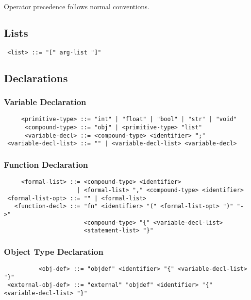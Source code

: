 Operator precedence follows normal conventions.

\subsection{Lists}
\begin{verbatim}
 <list> ::= "[" arg-list "]"
\end{verbatim}

\subsection{Declarations}

\subsubsection{Variable Declaration}

\begin{verbatim}
     <primitive-type> ::= "int" | "float" | "bool" | "str" | "void"
      <compound-type> ::= "obj" | <primitive-type> "list"
      <variable-decl> ::= <compound-type> <identifier> ";"
 <variable-decl-list> ::= "" | <variable-decl-list> <variable-decl>
\end{verbatim}

\subsubsection{Function Declaration}

\begin{verbatim}
     <formal-list> ::= <compound-type> <identifier>
                     | <formal-list> "," <compound-type> <identifier>
 <formal-list-opt> ::= "" | <formal-list>
   <function-decl> ::= "fn" <identifier> "(" <formal-list-opt> ")" "->"
                       <compound-type> "{" <variable-decl-list>
                       <statement-list> "}"
\end{verbatim}

\subsubsection{Object Type Declaration}

\begin{verbatim}
          <obj-def> ::= "objdef" <identifier> "{" <variable-decl-list> "}"
 <external-obj-def> ::= "external" "objdef" <identifier> "{" <variable-decl-list> "}"
\end{verbatim}

